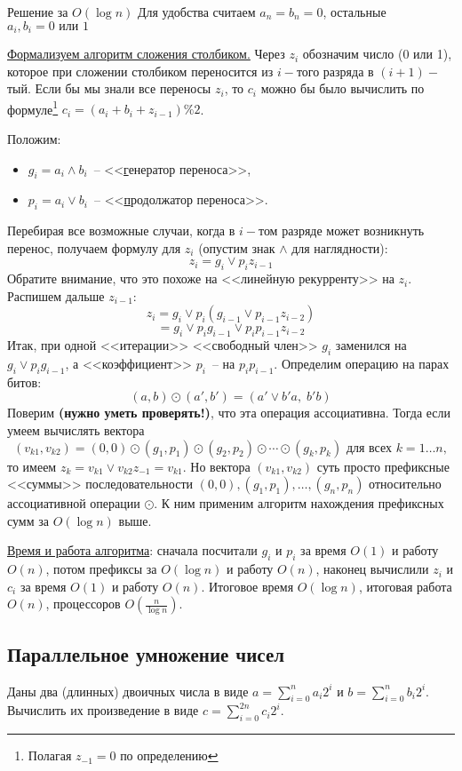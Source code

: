 \begin{algodescription}{Решение за $O(\log n)$}
    Для удобства считаем $a_n = b_n = 0$, остальные $a_i, b_i = 0\text{ или }1$

\underline{Формализуем алгоритм сложения столбиком.} Через $z_i$ обозначим число (0 или 1), которое при сложении столбиком переносится из $i-$того разряда в $(i+1)-$тый. Если бы мы знали все переносы $z_i$, то $c_i$ можно бы было вычислить по формуле\footnote{Полагая $z_{-1}=0$ по определению} $c_i = (a_i+b_i+z_{i-1})\%2$.

Положим:
\begin{itemize}
\item $g_i = a_i \land b_i$~-- <<\underline{г}енератор переноса>>,
\item $p_i = a_i \lor b_i$~-- <<\underline{п}родолжатор переноса>>.
\end{itemize}
Перебирая все возможные случаи, когда в $i-$том разряде может возникнуть перенос, получаем формулу для $z_i$ (опустим знак $\land$ для наглядности):
$$z_i = g_i \lor p_i z_{i-1}$$
Обратите внимание, что это похоже на <<линейную рекурренту>> на $z_i$. Распишем дальше $z_{i-1}$:
$$z_i = g_i \lor p_i(g_{i-1} \lor p_{i-1} z_{i-2})$$ $$ =g_i \lor p_i g_{i-1} \lor p_i p_{i-1} z_{i-2}$$
Итак, при одной <<итерации>> <<свободный член>> $g_i$ заменился на $g_i \lor p_i g_{i-1}$, а <<коэффициент>> $p_i$~-- на $p_i p_{i-1}$.
Определим операцию на парах битов: $$(a,b) \odot (a', b') = (a' \lor b' a, \;b' b)$$
Поверим \textbf{(нужно уметь проверять!)}, что эта операция ассоциативна.
Тогда если умеем вычислять вектора $$(v_{k1}, v_{k2}) = (0, 0)\odot (g_1, p_1)\odot (g_2, p_2)\odot \cdots \odot (g_k, p_k) \text{ для всех } k=1\ldots n,$$ то имеем $z_k = v_{k1} \lor v_{k2}z_{-1} = v_{k1}$. Но вектора $(v_{k1}, v_{k2})$ суть просто префиксные <<суммы>> последовательности $(0, 0), (g_1, p_1), \ldots, (g_n, p_n)$ относительно ассоциативной операции $\odot$. К ним применим алгоритм нахождения префиксных сумм за $O(\log n)$ выше.

\underline{Время и работа алгоритма}: сначала посчитали $g_i$ и $p_i$ за время $O(1)$ и работу $O(n)$, потом префиксы за $O(\log n)$ и работу $O(n)$, наконец вычислили $z_i$ и $c_i$ за время $O(1)$  и работу $O(n)$. Итоговое время $O(\log n)$, итоговая работа $O(n)$, процессоров $O(\frac{n}{\log n})$. 
\end{algodescription}

\subsection{Параллельное умножение чисел}
\begin{problem*}
	Даны два (длинных) двоичных числа в виде $a = \sum_{i=0}^n a_i 2^i$ и $b = \sum_{i=0}^n b_i 2^i$. Вычислить их произведение в виде $c = \sum_{i=0}^{2n} c_i 2^i$.
\end{problem*}

